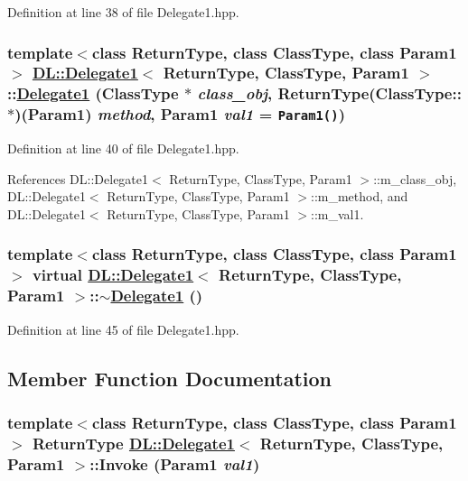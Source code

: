 Definition at line 38 of file Delegate1.hpp.\hypertarget{classDL_1_1Delegate1_a0}{
\subsubsection[Delegate1]{\setlength{\rightskip}{0pt plus 5cm}template$<$class Return\-Type, class Class\-Type, class Param1$>$ \hyperlink{classDL_1_1Delegate1}{DL::Delegate1}$<$ Return\-Type, Class\-Type, Param1 $>$::\hyperlink{classDL_1_1Delegate1}{Delegate1} (Class\-Type $\ast$ {\em class\_\-obj}, Return\-Type(Class\-Type::$\ast$)(Param1) {\em method}, Param1 {\em val1} = {\tt Param1()})}}
\label{classDL_1_1Delegate1_a0}




Definition at line 40 of file Delegate1.hpp.

References DL::Delegate1$<$ Return\-Type, Class\-Type, Param1 $>$::m\_\-class\_\-obj, DL::Delegate1$<$ Return\-Type, Class\-Type, Param1 $>$::m\_\-method, and DL::Delegate1$<$ Return\-Type, Class\-Type, Param1 $>$::m\_\-val1.\hypertarget{classDL_1_1Delegate1_a1}{
\subsubsection[$\sim$Delegate1]{\setlength{\rightskip}{0pt plus 5cm}template$<$class Return\-Type, class Class\-Type, class Param1$>$ virtual \hyperlink{classDL_1_1Delegate1}{DL::Delegate1}$<$ Return\-Type, Class\-Type, Param1 $>$::$\sim$\hyperlink{classDL_1_1Delegate1}{Delegate1} ()}}
\label{classDL_1_1Delegate1_a1}




Definition at line 45 of file Delegate1.hpp.

\subsection{Member Function Documentation}
\hypertarget{classDL_1_1Delegate1_a3}{
\subsubsection[Invoke]{\setlength{\rightskip}{0pt plus 5cm}template$<$class Return\-Type, class Class\-Type, class Param1$>$ Return\-Type \hyperlink{classDL_1_1Delegate1}{DL::Delegate1}$<$ Return\-Type, Class\-Type, Param1 $>$::Invoke (Param1 {\em val1})}}
\label{classDL_1_1Delegate1_a3}




